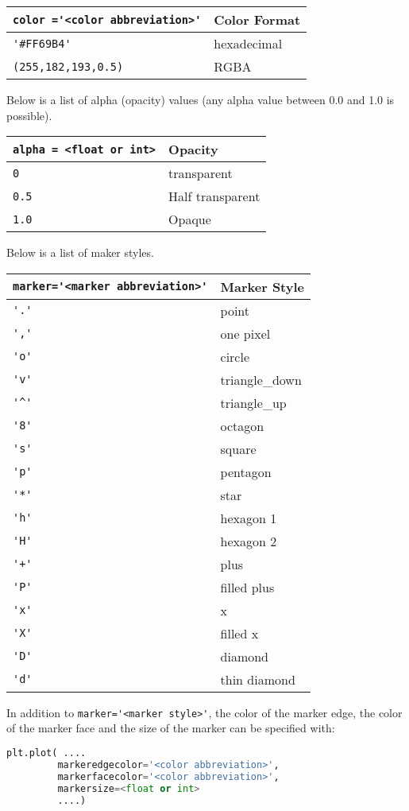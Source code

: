 \documentclass{book}
\newcommand{\passthrough}[1]{#1}
\begin{document}
\begin{longtable}[]{@{}ll@{}}
\toprule
\passthrough{\lstinline!color ='<color abbreviation>'!} & Color
Format\tabularnewline
\midrule
\endhead
\passthrough{\lstinline!'#FF69B4'!} & hexadecimal\tabularnewline
\passthrough{\lstinline!(255,182,193,0.5)!} & RGBA\tabularnewline
\bottomrule
\end{longtable}

Below is a list of alpha (opacity) values (any alpha value between 0.0
and 1.0 is possible).

\begin{longtable}[]{@{}ll@{}}
\toprule
\passthrough{\lstinline!alpha = <float or int>!} &
Opacity\tabularnewline
\midrule
\endhead
\passthrough{\lstinline!0!} & transparent\tabularnewline
\passthrough{\lstinline!0.5!} & Half transparent\tabularnewline
\passthrough{\lstinline!1.0!} & Opaque\tabularnewline
\bottomrule
\end{longtable}

Below is a list of maker styles.

\begin{longtable}[]{@{}ll@{}}
\toprule
\passthrough{\lstinline!marker='<marker abbreviation>'!} & Marker
Style\tabularnewline
\midrule
\endhead
\passthrough{\lstinline!'.'!} & point\tabularnewline
\passthrough{\lstinline!','!} & one pixel\tabularnewline
\passthrough{\lstinline!'o'!} & circle\tabularnewline
\passthrough{\lstinline!'v'!} & triangle\_down\tabularnewline
\passthrough{\lstinline!'^'!} & triangle\_up\tabularnewline
\passthrough{\lstinline!'8'!} & octagon\tabularnewline
\passthrough{\lstinline!'s'!} & square\tabularnewline
\passthrough{\lstinline!'p'!} & pentagon\tabularnewline
\passthrough{\lstinline!'*'!} & star\tabularnewline
\passthrough{\lstinline!'h'!} & hexagon 1\tabularnewline
\passthrough{\lstinline!'H'!} & hexagon 2\tabularnewline
\passthrough{\lstinline!'+'!} & plus\tabularnewline
\passthrough{\lstinline!'P'!} & filled plus\tabularnewline
\passthrough{\lstinline!'x'!} & x\tabularnewline
\passthrough{\lstinline!'X'!} & filled x\tabularnewline
\passthrough{\lstinline!'D'!} & diamond\tabularnewline
\passthrough{\lstinline!'d'!} & thin diamond\tabularnewline
\bottomrule
\end{longtable}

In addition to \passthrough{\lstinline!marker='<marker style>'!}, the
color of the marker edge, the color of the marker face and the size of
the marker can be specified with:

\begin{lstlisting}[language=Python]
plt.plot( .... 
         markeredgecolor='<color abbreviation>',
         markerfacecolor='<color abbreviation>',
         markersize=<float or int>
         ....)
\end{lstlisting}
    
\end{document}
